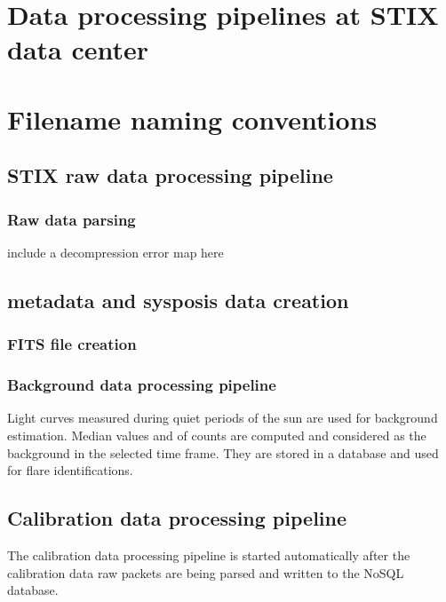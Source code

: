 \documentclass{aa}
\begin{document}
\section{Data processing pipelines at STIX data center}


\section{Filename naming conventions}

\subsection{STIX raw data processing pipeline}
\subsubsection{Raw data parsing}

include a decompression error map here

\subsection{metadata and sysposis data creation}

\subsubsection{FITS file creation}



\subsubsection{Background data processing pipeline}
Light curves measured during quiet periods of the sun are used for background estimation. Median values and of counts are computed and considered as the background in the selected time frame. They are stored in a database and used for flare identifications. 

\subsection{Calibration data processing pipeline}
The calibration data processing pipeline is started automatically after the calibration data raw packets
are being parsed and written to the NoSQL database.
\end{document}
